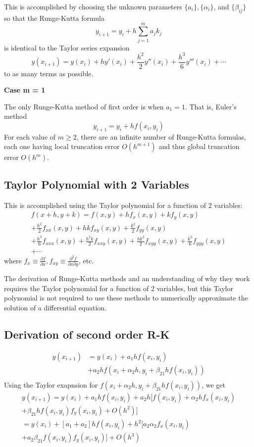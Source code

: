 \documentclass [titlepage,12pt,letter] {article}
\begin{document}
This is accomplished by choosing the unknown parameters $\{a_i\},\{\alpha_i\}$, and $\{\beta_{ij}\}$ so that the Runge-Kutta formula
\[
y_{i+1}=y_i+h\sum_{j=1}^m a_jk_j
\]
is identical to the Taylor series expansion
\[
y(x_{i+1})=y(x_i)+hy'(x_i)+\frac{h^2}{2}y''(x_i)+\frac{h^3}{6}y'''(x_i)+\dotsm
\]
to as many terms as possible.

{\bf Case  m = 1}
 
The only Runge-Kutta method of first order is when $a_1=1$. That is, Euler’s method
\[
y_{i+1}=y_i+hf(x_i,y_i)
\]
For each value of $m \geq 2$, there are an infinite number of Runge-Kutta formulas, each one having local truncation error $O(h^{m+1})$ and thus global truncation error $O(h^m)$.

\subsection{Taylor Polynomial with 2 Variables} 

This is accomplished using the Taylor polynomial for a function of 2 variables:
\begin{multline*}
f(x+h,y+k)=f(x,y)+hf_x(x,y)+kf_y(x,y) \\
	+\frac{h^2}{2}f_{xx}(x,y) + hkf_{xy}(x,y)+\frac{k^2}{2}f_{yy}(x,y) \\
	+\frac{h^3}{6}f_{xxx}(x,y)+\frac{h^2k}{2}f_{xxy}(x,y)+\frac{hk^2}{2}f_{xyy}(x,y)+\frac{k^3}{6}f_{yyy}(x,y) \\
	+ \dotsm
\end{multline*}
where $f_x \equiv \frac{\partial f}{\partial x}, f_{xy} \equiv \frac{\partial^2 f}{\partial x \partial y}$, etc.

The derivation of Runge-Kutta methods and an understanding of why they work requires the Taylor polynomial for a function of 2 variables, but this Taylor polynomial is not required to use these methods to numerically approximate the solution of a differential equation.

\subsection{Derivation of second order R-K} 

\begin{align*} 
y(x_{i+1}) &=  y(x_i) + a_1 h f(x_i, y_i)  \\
   &+ a_2 h f(x_i + \alpha_2 h, y_i + \beta_{21}hf(x_i,y_i))  \\ 
\end{align*} 
Using the Taylor exapnsion for $f(x_i + \alpha_2 h, y_i + \beta_{21}hf(x_i,y_i))$, we get
\begin{multline*} 
y(x_{i+1}) = y(x_i) + a_1 h f(x_i, y_i)+ a_2 h [ f(x_i,y_i) +   \alpha_2hf_x(x_i,y_i) \\
+ \beta_{21} h f (x_i, y_i) f_y(x_i,y_i) + O(h^2) ] \\
= y(x_i) + [a_1 + a_2] h f(x_i, y_i) + h^2 [ a_2 \alpha_2 f_x(x_i,y_i) \\
+ a_2 \beta_{21}f(x_i,y_i)f_y(x_i,y_i)] + O(h^3) 
\end{multline*} 
\end{document}
